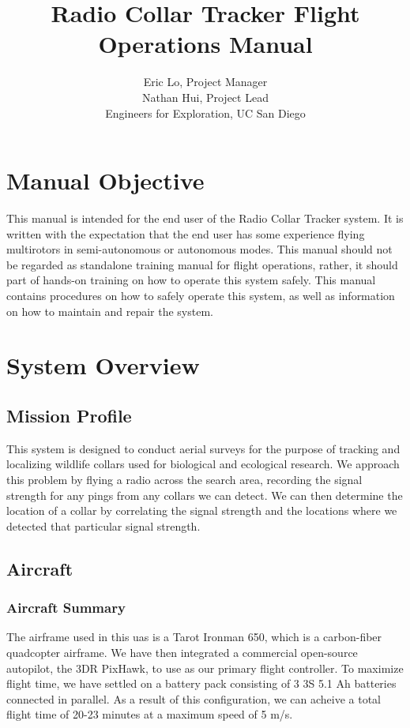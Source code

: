 \documentclass{report}
\title{Radio Collar Tracker Flight Operations Manual}
\author{Eric Lo, Project Manager\\Nathan Hui, Project Lead\\Engineers for Exploration, UC San Diego}
\begin{document}
\maketitle
\tableofcontents
\chapter{Manual Objective}
	This manual is intended for the end user of the Radio Collar Tracker system.  It is written with the expectation that the end user has some experience flying \glspl{multirotor} in semi-autonomous or autonomous modes.  This manual should not be regarded as standalone training manual for flight operations, rather, it should part of hands-on training on how to operate this system safely.  This manual contains procedures on how to safely operate this system, as well as information on how to maintain and repair the system.
\chapter{System Overview}
	\section{Mission Profile}
		This system is designed to conduct aerial surveys for the purpose of tracking and localizing wildlife collars used for biological and ecological research.  We approach this problem by flying a radio across the search area, recording the signal strength for any pings from any collars we can detect.  We can then determine the location of a collar by correlating the signal strength and the locations where we detected that particular signal strength.
	\section{Aircraft}
		\subsection{Aircraft Summary}
			The airframe used in this \gls{uas} is a Tarot Ironman 650, which is a carbon-fiber \gls{quadcopter} airframe.  We have then integrated a commercial open-source autopilot, the 3DR PixHawk, to use as our primary flight controller.  To maximize flight time, we have settled on a battery pack consisting of 3 3S 5.1 Ah batteries connected in parallel.  As a result of this configuration, we can acheive a total flight time of 20-23 minutes at a maximum speed of 5 m/s.
\end{document}
